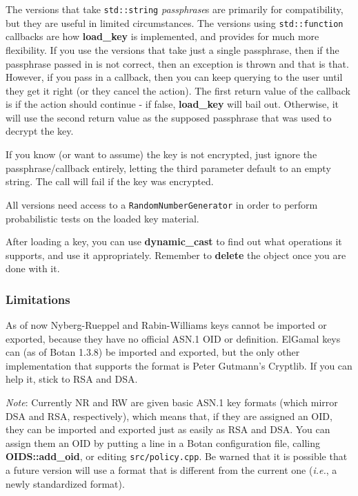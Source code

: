 \documentclass{article}
\newcommand{\filename}[1]{\texttt{#1}}
\newcommand{\function}[1]{\textbf{#1}}
\newcommand{\type}[1]{\texttt{#1}}
\renewcommand{\arg}[1]{\textsl{#1}}
\newcommand{\ie}[0]{\emph{i.e.}}
\begin{document}
The versions that take \type{std::string} \arg{passphrase}s are
primarily for compatibility, but they are useful in limited
circumstances. The versions using \type{std::function} callbacks are
how \function{load\_key} is implemented, and provides for much more
flexibility. If you use the versions that take just a single
passphrase, then if the passphrase passed in is not correct, then an
exception is thrown and that is that. However, if you pass in a
callback, then you can keep querying to the user until they get it
right (or they cancel the action). The first return value of the
callback is if the action should continue - if false,
\function{load_key} will bail out. Otherwise, it will use the second
return value as the supposed passphrase that was used to decrypt the
key.

If you know (or want to assume) the key is not encrypted, just ignore
the passphrase/callback entirely, letting the third parameter default
to an empty string. The call will fail if the key was encrypted.

All versions need access to a \type{RandomNumberGenerator} in order to
perform probabilistic tests on the loaded key material.

After loading a key, you can use \function{dynamic\_cast} to find out
what operations it supports, and use it appropriately. Remember to
\function{delete} the object once you are done with it.

\subsubsection{Limitations}

As of now Nyberg-Rueppel and Rabin-Williams keys cannot be imported or
exported, because they have no official ASN.1 OID or definition. ElGamal keys
can (as of Botan 1.3.8) be imported and exported, but the only other
implementation that supports the format is Peter Gutmann's Cryptlib. If you
can help it, stick to RSA and DSA.

\emph{Note}: Currently NR and RW are given basic ASN.1 key formats (which
mirror DSA and RSA, respectively), which means that, if they are assigned an
OID, they can be imported and exported just as easily as RSA and DSA. You can
assign them an OID by putting a line in a Botan configuration file, calling
\function{OIDS::add\_oid}, or editing \filename{src/policy.cpp}. Be warned that
it is possible that a future version will use a format that is different from
the current one (\ie, a newly standardized format).
\end{document}

